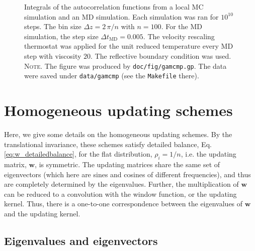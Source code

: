 \documentclass[reprint, superscriptaddress, floatfix]{revtex4-1}
\newcommand{\note}[1]{{\color{DarkGreen}\footnotesize \textsc{Note.} #1}}
\begin{document}
\begin{figure}[h]
\begin{center}
  \caption{
    \label{fig:gamcmp}
    Integrals of the autocorrelation functions
    from a local MC simulation
    and an MD simulation.
    Each simulation was ran for $10^{10}$ steps.
    The bin size $\Delta z = 2\, \pi /n$ with $n = 100$.
    For the MD simulation,
    the step size $\Delta t_\mathrm{MD} = 0.005$.
    The velocity rescaling thermostat\cite{bussi2007} was
    applied for the unit reduced temperature
    every MD step with viscosity $20$.
    The reflective boundary condition was used.
    \note{The figure was produced by \texttt{doc/fig/gamcmp.gp}.
      The data were saved under \texttt{data/gamcmp}
      (see the \texttt{Makefile} there).
    }%
  }
\end{center}
\end{figure}






\section{\label{sec:more_wband}
Homogeneous updating schemes
}


Here, we give some details
on the homogeneous updating schemes.
%
By the translational invariance,
these schemes
satisfy detailed balance,
Eq. \eqref{eq:w_detailedbalance},
for the flat distribution, $\rho_i = 1/n$,
i.e. the updating matrix, $\mathbf w$,
is symmetric.
%
The updating matrices
share the same set of eigenvectors
(which here are sines and cosines of different frequencies),
and thus are completely determined
by the eigenvalues.
%
Further, the multiplication of $\mathbf w$
can be reduced to a convolution with the window function,
or the updating kernel.
%
Thus,
there is a one-to-one correspondence between
the eigenvalues of $\mathbf w$
and the updating kernel.



\subsection{\label{sec:wband_eig}
Eigenvalues and eigenvectors}

\end{document}
